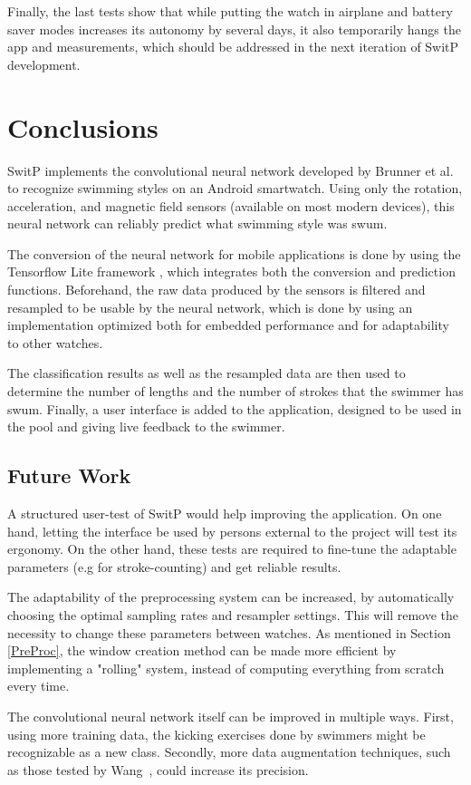 \documentclass[a4paper, oneside]{discothesis}
\begin{document}
Finally, the last tests show that while putting the watch in airplane and battery saver modes increases its autonomy by several days, it also temporarily hangs the app and measurements, which should be addressed in the next iteration of SwitP development.

\chapter{Conclusions}
SwitP implements the convolutional neural network developed by Brunner et al.~\cite{BMSW19} to recognize swimming styles on an Android smartwatch. Using only the rotation, acceleration, and magnetic field sensors (available on most modern devices), this neural network can reliably predict what swimming style was swum.

The conversion of the neural network for mobile applications is done by using the Tensorflow Lite framework \cite{TFLite20}, which integrates both the conversion and prediction functions. Beforehand, the raw data produced by the sensors is filtered and resampled to be usable by the neural network, which is done by using an implementation optimized both for embedded performance and for adaptability to other watches.

The classification results as well as the resampled data are then used to determine the number of lengths and the number of strokes that the swimmer has swum. Finally, a user interface is added to the application, designed to be used in the pool and giving live feedback to the swimmer.

\section{Future Work}
A structured user-test of SwitP would help improving the application. On one hand, letting the interface be used by persons external to the project will test its ergonomy. On the other hand, these tests are required to fine-tune the adaptable parameters (e.g for stroke-counting) and get reliable results.

The adaptability of the preprocessing system can be increased, by automatically choosing the optimal sampling rates and resampler settings. This will remove the necessity to change these parameters between watches. As mentioned in Section \ref{PreProc}, the window creation method can be made more efficient by implementing a "rolling" system, instead of computing everything from scratch every time.

The convolutional neural network itself can be improved in multiple ways. First, using more training data, the kicking exercises done by swimmers might be recognizable as a new class. Secondly, more data augmentation techniques, such as those tested by Wang~\cite{WANG19}, could increase its precision.
\end{document}
